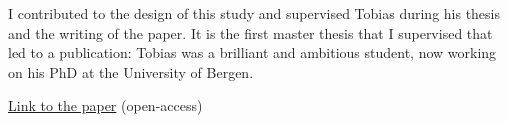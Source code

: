 I contributed to the design of this study and supervised Tobias during his thesis and the writing of the paper.
It is the first master thesis that I supervised that led to a publication: Tobias was a
brilliant and ambitious student, now working on his PhD at the University of Bergen.

\href{https://doi.org/10.5194/tc-13-469-2019}{Link to the paper} (open-access)


%

